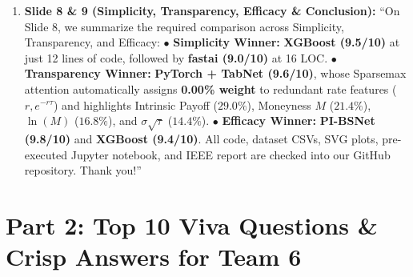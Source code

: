 \documentclass[10pt]{article}
\begin{document}
\begin{enumerate}
    \item \textbf{Slide 8 \& 9 (Simplicity, Transparency, Efficacy \& Conclusion):}
    ``On Slide 8, we summarize the required comparison across Simplicity, Transparency, and Efficacy:
    $\bullet$ \textbf{Simplicity Winner:} \textbf{XGBoost (9.5/10)} at just 12 lines of code, followed by \textbf{fastai (9.0/10)} at 16 LOC.
    $\bullet$ \textbf{Transparency Winner:} \textbf{PyTorch + TabNet (9.6/10)}, whose Sparsemax attention automatically assigns \textbf{0.00\% weight} to redundant rate features ($r, e^{-r\tau}$) and highlights Intrinsic Payoff ($29.0\%$), Moneyness $M$ ($21.4\%$), $\ln(M)$ ($16.8\%$), and $\sigma\sqrt{\tau}$ ($14.4\%$).
    $\bullet$ \textbf{Efficacy Winner:} \textbf{PI-BSNet (9.8/10)} and \textbf{XGBoost (9.4/10)}.
    All code, dataset CSVs, SVG plots, pre-executed Jupyter notebook, and IEEE report are checked into our GitHub repository. Thank you!''
\end{enumerate}

\newpage
\section*{\color{royal}Part 2: Top 10 Viva Questions \& Crisp Answers for Team 6}
\end{document}
